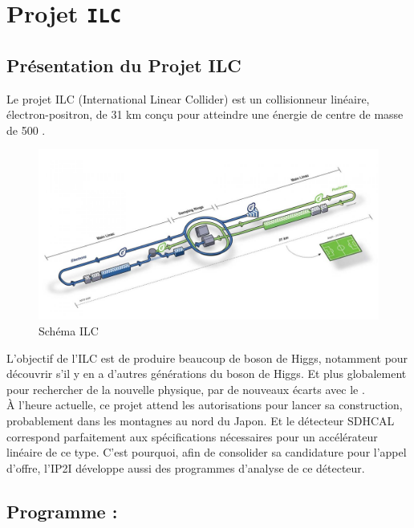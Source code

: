 
\chapter{Projet \texttt{ILC}}

\section{Présentation du Projet ILC}

Le projet ILC (International Linear Collider) est un collisionneur linéaire, électron-positron, de 31 km conçu pour atteindre une énergie de centre de masse de 500 \GeV \cite{cern:ilc}. \\

\begin{figure}[h!]
	\center
	\includegraphics[width=\textwidth]{../img/ilc.jpg} 
	\caption{Schéma ILC\cite{cern:ilc}}
	\label{ilc:schema}
\end{figure}

L'objectif de l'ILC est de produire beaucoup de boson de Higgs, notamment pour découvrir s'il y en a d'autres générations du boson de Higgs. Et plus globalement pour rechercher de la nouvelle physique, par de nouveaux écarts avec le \MS.\\

À l'heure actuelle, ce projet attend les autorisations pour lancer sa construction, probablement dans les montagnes au nord du Japon. 
Et le détecteur SDHCAL correspond parfaitement aux spécifications nécessaires pour un accélérateur linéaire de ce type.
C'est pourquoi, afin de consolider sa candidature pour l'appel d'offre, l'IP2I développe aussi des programmes d'analyse de ce détecteur.

\section{Programme : \original}

